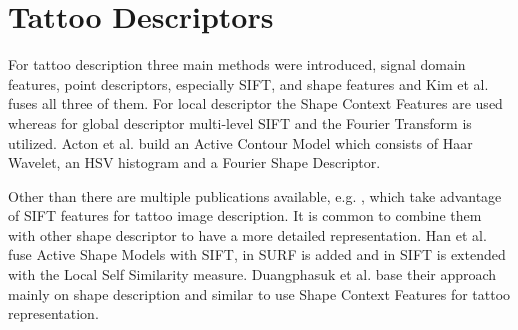 \documentclass[draft,final]{vutinfth} %
\begin{document}
\section*{Tattoo Descriptors}
\par
For tattoo description three main methods were introduced, signal domain features, point descriptors, especially SIFT, and shape features and Kim et al. \cite{kim2015robust} fuses all three of them.
For local descriptor the Shape Context Features are used whereas for global descriptor multi-level SIFT and the Fourier Transform is utilized.
Acton et al. \cite{acton2008matching} build an Active Contour Model which consists of Haar Wavelet, an HSV histogram and a Fourier Shape Descriptor.
\par
Other than  \cite{kim2015robust} there are multiple publications available, e.g. \cite{duangphasuk2013tattoo}, which take advantage of SIFT features for tattoo image description.
It is common to combine them with other shape descriptor to have a more detailed representation.
Han et al. \cite{han2013tattoo} fuse Active Shape Models with SIFT,  in \cite{yi2015impact} SURF is added and in \cite{kim2016tattoo} SIFT is extended with the Local Self Similarity measure.
Duangphasuk et al. \cite{duangphasuk2013tattoo} base their approach mainly on shape description and similar to  \cite{kim2015robust} use Shape Context Features for tattoo representation.
\end{document}
